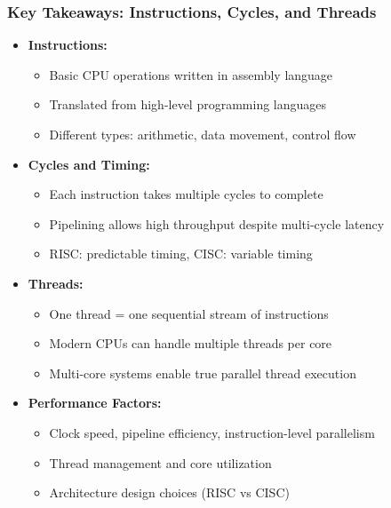 \begin{frame}
\frametitle{Key Takeaways: Instructions, Cycles, and Threads}
\begin{itemize}
    \item \textbf{Instructions:}
    \begin{itemize}
        \item Basic CPU operations written in assembly language
        \item Translated from high-level programming languages
        \item Different types: arithmetic, data movement, control flow
    \end{itemize}
    \item \textbf{Cycles and Timing:}
    \begin{itemize}
        \item Each instruction takes multiple cycles to complete
        \item Pipelining allows high throughput despite multi-cycle latency
        \item RISC: predictable timing, CISC: variable timing
    \end{itemize}
    \item \textbf{Threads:}
    \begin{itemize}
        \item One thread = one sequential stream of instructions
        \item Modern CPUs can handle multiple threads per core
        \item Multi-core systems enable true parallel thread execution
    \end{itemize}
    \item \textbf{Performance Factors:}
    \begin{itemize}
        \item Clock speed, pipeline efficiency, instruction-level parallelism
        \item Thread management and core utilization
        \item Architecture design choices (RISC vs CISC)
    \end{itemize}
\end{itemize}
\end{frame}



